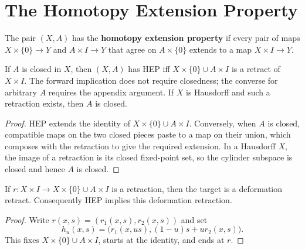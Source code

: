 \section{The Homotopy Extension Property}
\label{sec:homotopy-extension-property}

\begin{definition}
\label{def:homotopy-extension-property}
\leanok
{}
The pair $(X,A)$ has the \textbf{homotopy extension property} if every pair of maps
$X\times\{0\}\to Y$ and $A\times I\to Y$ that agree on $A\times\{0\}$ extends
to a map $X\times I\to Y$.
\end{definition}

\begin{proposition}
\label{prop:hep-iff-retract}
\leanok
{}
If $A$ is closed in $X$, then $(X,A)$ has HEP iff
$X\times\{0\}\cup A\times I$ is a retract of $X\times I$. The forward implication
does not require closedness; the converse for arbitrary $A$ requires the appendix
argument. If $X$ is Hausdorff and such a retraction exists, then $A$ is closed.
\end{proposition}

\begin{proof}
\leanok
\sketch HEP extends the identity of
$X\times\{0\}\cup A\times I$. Conversely, when $A$ is closed, compatible maps on
the two closed pieces paste to a map on their union, which composes with the retraction
to give the required extension. In a Hausdorff $X$, the image of a retraction is its
closed fixed-point set, so the cylinder subspace is closed and hence $A$ is closed.
\end{proof}

\begin{lemma}
\label{lem:hep-cylinder-deformation-retract}
\leanok
{}
If $r:X\times I\to X\times\{0\}\cup A\times I$ is a retraction, then the target
is a deformation retract. Consequently HEP implies this deformation retraction.
\end{lemma}

\begin{proof}
\leanok
\sketch Write $r(x,s)=(r_1(x,s),r_2(x,s))$ and set
\[
h_u(x,s)=\bigl(r_1(x,us),(1-u)s+u r_2(x,s)\bigr).
\]
This fixes $X\times\{0\}\cup A\times I$, starts at the identity, and ends at $r$.
\end{proof}

